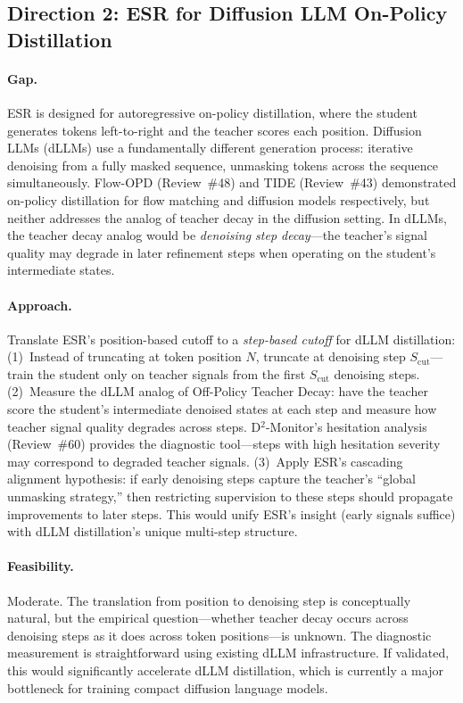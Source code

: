 \documentclass[11pt,a4paper]{article}
\begin{document}
\subsection*{Direction 2: ESR for Diffusion LLM On-Policy Distillation}

\paragraph{Gap.}
ESR is designed for autoregressive on-policy distillation, where the student generates tokens left-to-right and the teacher scores each position. Diffusion LLMs (dLLMs) use a fundamentally different generation process: iterative denoising from a fully masked sequence, unmasking tokens across the sequence simultaneously. Flow-OPD (Review~\#48) and TIDE (Review~\#43) demonstrated on-policy distillation for flow matching and diffusion models respectively, but neither addresses the analog of teacher decay in the diffusion setting. In dLLMs, the teacher decay analog would be \emph{denoising step decay}---the teacher's signal quality may degrade in later refinement steps when operating on the student's intermediate states.

\paragraph{Approach.}
Translate ESR's position-based cutoff to a \emph{step-based cutoff} for dLLM distillation: (1)~Instead of truncating at token position $N$, truncate at denoising step $S_{\mathrm{cut}}$---train the student only on teacher signals from the first $S_{\mathrm{cut}}$ denoising steps. (2)~Measure the dLLM analog of Off-Policy Teacher Decay: have the teacher score the student's intermediate denoised states at each step and measure how teacher signal quality degrades across steps. D$^2$-Monitor's hesitation analysis (Review~\#60) provides the diagnostic tool---steps with high hesitation severity may correspond to degraded teacher signals. (3)~Apply ESR's cascading alignment hypothesis: if early denoising steps capture the teacher's ``global unmasking strategy,'' then restricting supervision to these steps should propagate improvements to later steps. This would unify ESR's insight (early signals suffice) with dLLM distillation's unique multi-step structure.

\paragraph{Feasibility.}
Moderate. The translation from position to denoising step is conceptually natural, but the empirical question---whether teacher decay occurs across denoising steps as it does across token positions---is unknown. The diagnostic measurement is straightforward using existing dLLM infrastructure. If validated, this would significantly accelerate dLLM distillation, which is currently a major bottleneck for training compact diffusion language models.
\end{document}
